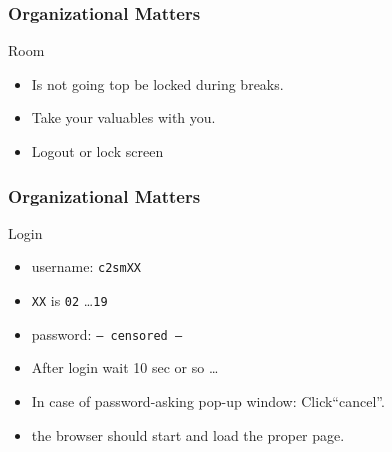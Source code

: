 \documentclass[xcolor=pdftex,dvipsnames,table]{beamer}
\begin{document}
\begin{frame}
  \frametitle{Organizational Matters}
  \begin{block}{Room}
    \begin{itemize}
      \item Is not going top be locked during breaks.
      \item Take your valuables with you.
      \item Logout or lock screen
    \end{itemize}
  \end{block}
\end{frame}

\begin{frame}
  \frametitle{Organizational Matters}
  \begin{block}{Login}
    \begin{itemize}
      \item username: \texttt{c2smXX}
      \item \texttt{XX} is \texttt{02} \ldots \texttt{19}  
      \item password: \texttt{--- censored ---}
      \item After login wait 10 sec or so \ldots
      \item In case of password-asking pop-up window: Click``cancel''.
      \item the browser should start and load the proper page.
    \end{itemize}
  \end{block}
\end{frame}
\end{document}
